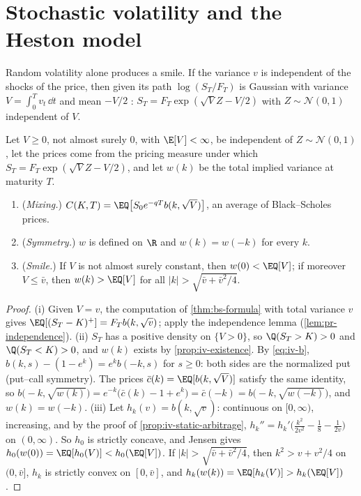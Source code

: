 \section{Stochastic volatility and the Heston model}\label{sec:iv-heston}

Random volatility alone produces a smile. If the variance $v$ is independent of the shocks of the
price, then given its path $\log(S_T/F_T)$ is Gaussian with variance $V=\int_0^Tv_t\,\dd t$ and mean $-V/2$
\citep{hull-white-1987}: $S_T=F_T\exp(\sqrt VZ-V/2)$ with $Z\sim\mathcal N(0,1)$ independent of $V$.

\begin{proposition}\label{prop:iv-mixing}
Let $V\ge0$, not almost surely $0$, with $\E[V]<\infty$, be independent of $Z\sim\mathcal N(0,1)$, let the
prices come from the pricing measure under which $S_T=F_T\exp(\sqrt VZ-V/2)$, and let $w(k)$ be the total
implied variance at maturity $T$.
\begin{enumerate}[label=(\roman*)]
  \item (\emph{Mixing.}) $C(K,T)=\EQ\big[S_0e^{-qT}b(k,\sqrt V)\big]$, an average of Black--Scholes prices.
  \item (\emph{Symmetry.}) $w$ is defined on $\R$ and $w(k)=w(-k)$ for every $k$.
  \item (\emph{Smile.}) If $V$ is not almost surely constant, then $w(0)<\EQ[V]$; if moreover $V\le\bar v$,
    then $w(k)>\EQ[V]$ for all $|k|>\sqrt{\bar v+\bar v^2/4}$.
\end{enumerate}
\end{proposition}

\begin{proof}
(i) Given $V=v$, the computation of \cref{thm:bs-formula} with total variance $v$ gives
$\EQ[(S_T-K)^+]=F_Tb(k,\sqrt v)$; apply the independence lemma (\cref{lem:pr-independence}).
(ii) $S_T$ has a positive density on $\{V>0\}$, so $\Q(S_T>K)>0$ and $\Q(S_T<K)>0$, and $w(k)$ exists by
\cref{prop:iv-existence}. By \eqref{eq:iv-b}, $b(k,s)-(1-e^k)=e^kb(-k,s)$ for $s\ge0$: both sides are the
normalized put (put--call symmetry). The prices $\bar c(k)=\EQ[b(k,\sqrt V)]$ satisfy the same identity, so
$b\big(-k,\sqrt{w(k)}\big)=e^{-k}\big(\bar c(k)-1+e^k\big)=\bar c(-k)=b\big(-k,\sqrt{w(-k)}\big)$, and $w(k)=w(-k)$.
(iii) Let $h_k(v)=b(k,\sqrt v)$: continuous on $[0,\infty)$, increasing, and by the proof of
\cref{prop:iv-static-arbitrage}, $h_k''=h_k'\big(\frac{k^2}{2v^2}-\frac18-\frac1{2v}\big)$ on $(0,\infty)$. So
$h_0$ is strictly concave, and Jensen gives $h_0(w(0))=\EQ[h_0(V)]<h_0(\EQ[V])$. If
$|k|>\sqrt{\bar v+\bar v^2/4}$, then $k^2>v+v^2/4$ on $(0,\bar v]$, $h_k$ is strictly convex on $[0,\bar v]$,
and $h_k(w(k))=\EQ[h_k(V)]>h_k(\EQ[V])$.
\end{proof}

